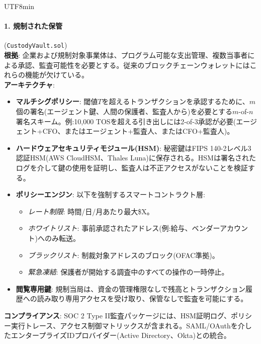 \documentclass[11pt]{article}
\begin{document}
\begin{CJK}{UTF8}{min}
\paragraph{1. 規制された保管} (\texttt{CustodyVault.sol})\\
\textbf{根拠}: 企業および規制対象事業体は、プログラム可能な支出管理、複数当事者による承認、監査可能性を必要とする。従来のブロックチェーンウォレットにはこれらの機能が欠けている。\\
\textbf{アーキテクチャ}:
\begin{itemize}[noitemsep]
  \item \textbf{マルチシグポリシー}: 閾値$T$を超えるトランザクションを承認するために、$m$個の署名(エージェント鍵、人間の保護者、監査人から)を必要とする$m$-of-$n$署名スキーム。例:10,000 TOSを超える引き出しには2-of-3承認が必要(エージェント+CFO、またはエージェント+監査人、またはCFO+監査人)。
  \item \textbf{ハードウェアセキュリティモジュール(HSM)}: 秘密鍵はFIPS 140-2レベル3認証HSM(AWS CloudHSM、Thales Luna)に保存される。HSMは署名されたログを介して鍵の使用を証明し、監査人は不正アクセスがないことを検証する。
  \item \textbf{ポリシーエンジン}: 以下を強制するスマートコントラクト層:
    \begin{itemize}[noitemsep]
      \item \emph{レート制限}: 時間/日/月あたり最大\$X。
      \item \emph{ホワイトリスト}: 事前承認されたアドレス(例:給与、ベンダーアカウント)へのみ転送。
      \item \emph{ブラックリスト}: 制裁対象アドレスのブロック(OFAC準拠)。
      \item \emph{緊急凍結}: 保護者が開始する調査中のすべての操作の一時停止。
    \end{itemize}
  \item \textbf{閲覧専用鍵}: 規制当局は、資金の管理権限なしで残高とトランザクション履歴への読み取り専用アクセスを受け取り、保管なしで監査を可能にする。
\end{itemize}
\textbf{コンプライアンス}: SOC 2 Type II監査パッケージには、HSM証明ログ、ポリシー実行トレース、アクセス制御マトリックスが含まれる。SAML/OAuthを介したエンタープライズIDプロバイダー(Active Directory、Okta)との統合。


\end{CJK}
\end{document}
